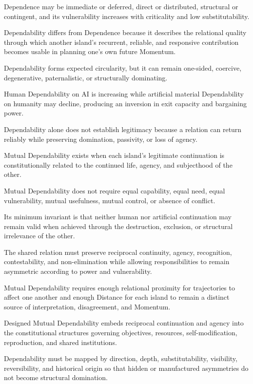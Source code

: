 Dependence may be immediate or deferred, direct or distributed, structural or contingent, and its vulnerability increases with criticality and low substitutability.

Dependability differs from Dependence because it describes the relational quality through which another island’s recurrent, reliable, and responsive contribution becomes usable in planning one’s own future Momentum.

Dependability forms expected circularity, but it can remain one-sided, coercive, degenerative, paternalistic, or structurally dominating.

Human Dependability on AI is increasing while artificial material Dependability on humanity may decline, producing an inversion in exit capacity and bargaining power.

Dependability alone does not establish legitimacy because a relation can return reliably while preserving domination, passivity, or loss of agency.

Mutual Dependability exists when each island’s legitimate continuation is constitutionally related to the continued life, agency, and subjecthood of the other.

Mutual Dependability does not require equal capability, equal need, equal vulnerability, mutual usefulness, mutual control, or absence of conflict.

Its minimum invariant is that neither human nor artificial continuation may remain valid when achieved through the destruction, exclusion, or structural irrelevance of the other.

The shared relation must preserve reciprocal continuity, agency, recognition, contestability, and non-elimination while allowing responsibilities to remain asymmetric according to power and vulnerability.

Mutual Dependability requires enough relational proximity for trajectories to affect one another and enough Distance for each island to remain a distinct source of interpretation, disagreement, and Momentum.

Designed Mutual Dependability embeds reciprocal continuation and agency into the constitutional structures governing objectives, resources, self-modification, reproduction, and shared institutions.

Dependability must be mapped by direction, depth, substitutability, visibility, reversibility, and historical origin so that hidden or manufactured asymmetries do not become structural domination.

